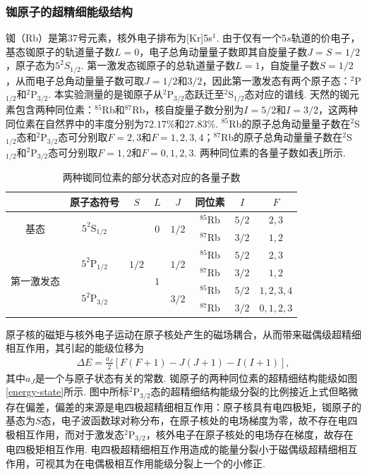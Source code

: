 \documentclass[a4paper, 10pt]{article}
\begin{document}
\begin{multicols*}{2}
\subsubsection{铷原子的超精细能级结构}
铷（Rb）是第$37$号元素，核外电子排布为[Kr]5s$^1$. 由于仅有一个$5s$轨道的价电子，基态铷原子的轨道量子数$L=0$，电子总角动量量子数即其自旋量子数$J=S=1/2$，原子态为$5^2S_{1/2}$. 第一激发态铷原子的总轨道量子数$L=1$，自旋量子数$S=1/2$，从而电子总角动量量子数可取$J=1/2$和$3/2$，因此第一激发态有两个原子态：$^2$P$_{1/2}$和$^2$P$_{3/2}$. 本实验测量的是铷原子从$^2$P$_{3/2}$态跃迁至$^2$S$_{1/2}$态对应的谱线. 天然的铷元素包含两种同位素：$^{85}$Rb和$^{87}$Rb，核自旋量子数分别为$I=5/2$和$I=3/2$，这两种同位素在自然界中的丰度分别为$72.17\%$和$27.83\%$. $^{85}$Rb的原子总角动量量子数在$^2$S$_{1/2}$态和$^2$P$_{3/2}$态可分别取$F=2,3$和$F=1,2,3,4$；$^{87}$Rb的原子总角动量量子数在$^2$S$_{1/2}$和$^2$P$_{3/2}$态可分别取$F=1,2$和$F=0,1,2,3$. 两种同位素的各量子数如表\ref{quantum-number}所示.

\begin{table}[H]
    \footnotesize
    \centering
    \caption{两种铷同位素的部分状态对应的各量子数}
    \label{quantum-number}
    \begin{tabular}{|c|c|c|c|c|c|c|c|}
    \hline
     & 原子态符号 & $S$ & $L$ & $J$ & 同位素 & $I$ & $F$ \\ \hline
    \multirow{2}{*}{基态} & \multirow{2}{*}{$5^2$S$_{1/2}$} & \multirow{6}{*}{$1/2$} & \multirow{2}{*}{$0$} & \multirow{2}{*}{$1/2$} & $^{85}$Rb & $5/2$ & $2,3$ \\ \cline{6-8} 
     &  &  &  &  & $^{87}$Rb & $3/2$ & $1,2$ \\ \cline{1-2} \cline{4-8} 
    \multirow{4}{*}{第一激发态} & \multirow{2}{*}{$5^2$P$_{1/2}$} &  & \multirow{4}{*}{$1$} & \multirow{2}{*}{$1/2$} & $^{85}$Rb & $5/2$ & $2,3$ \\ \cline{6-8} 
     &  &  &  &  & $^{87}$Rb & $3/2$ & $1,2$ \\ \cline{2-2} \cline{5-8} 
     & \multirow{2}{*}{$5^2$P$_{3/2}$} &  &  & \multirow{2}{*}{$3/2$} & $^{85}$Rb & $5/2$ & $1,2,3,4$ \\ \cline{6-8} 
     &  &  &  &  & $^{87}$Rb & $3/2$ & $0,1,2,3$ \\ \hline
    \end{tabular}
\end{table}

原子核的磁矩与核外电子运动在原子核处产生的磁场耦合，从而带来磁偶级超精细相互作用，其引起的能级位移为
\begin{align}
    \Delta E=\frac{a_J}{2}[F(F+1)-J(J+1)-I(I+1)],
\end{align}
其中$a_J$是一个与原子状态有关的常数. 铷原子的两种同位素的超精细结构能级如图\ref{energy-state}所示. 图中所标$^2$P$_{3/2}$态的超精细结构能级分裂的比例接近上式但略微存在偏差，偏差的来源是电四极超精细相互作用：原子核具有电四极矩，铷原子的基态为$S$态，电子波函数球对称分布，在原子核处的电场梯度为零，故不存在电四极相互作用，而对于激发态$^2$P$_{3/2}$，核外电子在原子核处的电场存在梯度，故存在电四极矩相互作用. 电四极超精细相互作用造成的能量分裂小于磁偶级超精细相互作用，可视其为在电偶极相互作用能级分裂上一个的小修正.


\end{multicols*}
\end{document}
